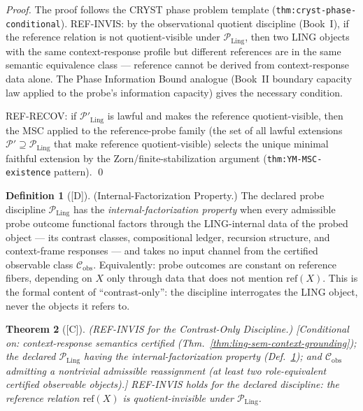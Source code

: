 \documentclass[12pt,oneside]{amsbook}
\theoremstyle{plain}
\newtheorem{theorem}{Theorem}[section]
\theoremstyle{definition}
\newtheorem{definition}[theorem]{Definition}
\theoremstyle{remark}
\newcommand{\status}[1]{\textup{[#1]}}
\begin{document}
\begin{proof}
The proof follows the CRYST phase problem template
(\texttt{thm:cryst-phase-conditional}).
REF-INVIS: by the observational quotient discipline (Book~I),
if the reference relation is not quotient-visible under
$\mathcal{P}_{\mathrm{Ling}}$, then two LING objects with the
same context-response profile but different references are in the
same semantic equivalence class --- reference cannot be derived
from context-response data alone.  The Phase Information Bound
analogue (Book~II boundary capacity law applied to the probe's
information capacity) gives the necessary condition.

REF-RECOV: if $\mathcal{P}'_{\mathrm{Ling}}$ is lawful and makes
the reference quotient-visible, then the MSC applied to the
reference-probe family (the set of all lawful extensions
$\mathcal{P}' \supseteq \mathcal{P}_{\mathrm{Ling}}$ that make
reference quotient-visible) selects the unique minimal faithful
extension by the Zorn/finite-stabilization argument
(\texttt{thm:YM-MSC-existence} pattern).
\qed
\end{proof}

\begin{definition}[\status{D}]\label{def:ling-probe-factorization}
\textup{(Internal-Factorization Property.)}
The declared probe discipline $\mathcal{P}_{\mathrm{Ling}}$ has the
\emph{internal-factorization property} when every admissible probe
outcome functional factors through the LING-internal data of the
probed object --- its contrast classes, compositional ledger,
recursion structure, and context-frame responses --- and takes no
input channel from the certified observable class
$\mathcal{C}_{\mathrm{obs}}$.  Equivalently: probe outcomes are
constant on reference fibers, depending on $X$ only through data
that does not mention $\mathrm{ref}(X)$.  This is the formal
content of ``contrast-only'': the discipline interrogates the LING
object, never the objects it refers to.
\end{definition}

\begin{theorem}[\status{C}]\label{thm:ling-REF-INVIS}
\textup{(REF-INVIS for the Contrast-Only Discipline.)}
\textup{[Conditional on: context-response semantics certified
(Thm.~\ref{thm:ling-sem-context-grounding}); the declared
$\mathcal{P}_{\mathrm{Ling}}$ having the internal-factorization
property (Def.~\ref{def:ling-probe-factorization}); and
$\mathcal{C}_{\mathrm{obs}}$ admitting a nontrivial admissible
reassignment (at least two role-equivalent certified observable
objects).]}
REF-INVIS holds for the declared discipline: the reference
relation $\mathrm{ref}(X)$ is quotient-invisible under
$\mathcal{P}_{\mathrm{Ling}}$.
\end{theorem}
\end{document}
